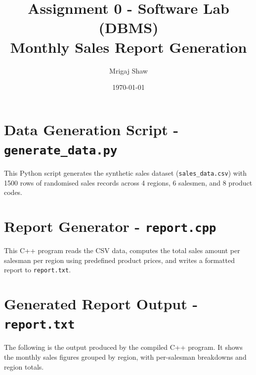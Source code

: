 \documentclass[12pt,a4paper]{article}
\title{\textbf{Assignment 0 - Software Lab (DBMS)}\\[4pt]
       \large Monthly Sales Report Generation}
\author{Mrigaj Shaw}
\date{\today}
\begin{document}
\maketitle
\thispagestyle{fancy}
\tableofcontents
\newpage

\section{Data Generation Script - \texttt{generate\_data.py}}

This Python script generates the synthetic sales dataset (\texttt{sales\_data.csv}) with 1500 rows of randomised sales records across 4 regions, 6 salesmen, and 8 product codes.



\newpage
\section{Report Generator - \texttt{report.cpp}}

This C++ program reads the CSV data, computes the total sales amount per salesman per region using predefined product prices, and writes a formatted report to \texttt{report.txt}.



\newpage
\section{Generated Report Output - \texttt{report.txt}}

The following is the output produced by the compiled C++ program. It shows the monthly sales figures grouped by region, with per-salesman breakdowns and region totals.
\end{document}
